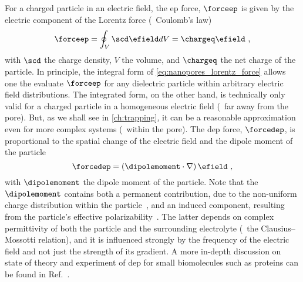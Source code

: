 For a charged particle in an electric field, the \gls{ep} force, $\forceep$ is given by the electric component
of the Lorentz force (\ie~Coulomb's law)~\cite{Lu-2012}
%
\begin{equation}\label{eq:nanopores_lorentz_force}
  \forceep = \oint_{V} \scd \efield dV = \chargeq \efield
  \text{ ,}
\end{equation}
%
with $\scd$ the charge density, $V$ the volume, and $\chargeq$ the net charge of the particle. In principle,
the integral form of \cref{eq:nanopores_lorentz_force} allows one the evaluate $\forceep$ for any dielectric
particle within arbitrary electric field distributions. The integrated form, on the other hand, is technically
only valid for a charged particle in a homogeneous electric field (\ie~far away from the pore). But, as we
shall see in \cref{ch:trapping}, it can be a reasonable approximation even for more complex systems
(\eg~within the pore). The \gls{dep} force, $\forcedep$, is proportional to the spatial change of the electric
field and the dipole moment of the particle~\cite{Hoelzel-2020}
%
\begin{equation}\label{eq:nanopores_dep_force}
  \forcedep = \left( \dipolemoment \cdot \nabla \right) \efield
  \text{ ,}
\end{equation}
%
with $\dipolemoment$ the dipole moment of the particle. Note that the $\dipolemoment$ contains both a
permanent contribution, due to the non-uniform charge distribution within the
particle~\cite{Hoelzel-2020,VanMeervelt-2017}, and an induced component, resulting from the particle's
effective polarizability~\cite{Minerick-2015}. The latter depends on complex permittivity of both the particle
and the surrounding electrolyte (\ie~the Clausius--Mossotti relation), and it is influenced strongly by the
frequency of the electric field and not just the strength of its gradient. A more in-depth discussion on state
of theory and experiment of \gls{dep} for small biomolecules such as proteins can be found in
Ref.~\cite{Hoelzel-2020}.

